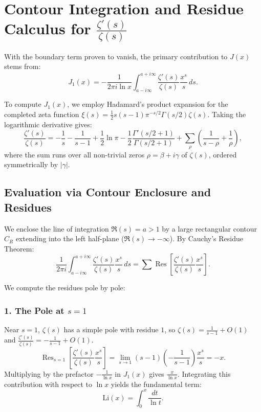 \documentclass[11pt,a4paper]{article}
\theoremstyle{definition}
\begin{document}
\section{Contour Integration and Residue Calculus for $\frac{\zeta'(s)}{\zeta(s)}$}

With the boundary term proven to vanish, the primary contribution to $J(x)$ stems from:
\begin{equation}
    J_1(x) = -\frac{1}{2\pi i \ln x} \int_{a - i\infty}^{a + i\infty} \frac{\zeta'(s)}{\zeta(s)} \frac{x^s}{s} \, ds.
\end{equation}

To compute $J_1(x)$, we employ Hadamard's product expansion for the completed zeta function $\xi(s) = \frac{1}{2} s(s-1)\pi^{-s/2}\Gamma(s/2)\zeta(s)$. Taking the logarithmic derivative gives:
\begin{equation}
    \frac{\zeta'(s)}{\zeta(s)} = -\frac{1}{s} - \frac{1}{s-1} + \frac{1}{2}\ln \pi - \frac{1}{2}\frac{\Gamma'(s/2+1)}{\Gamma(s/2+1)} + \sum_{\rho} \left( \frac{1}{s - \rho} + \frac{1}{\rho} \right),
\end{equation}
where the sum runs over all non-trivial zeros $\rho = \beta + i\gamma$ of $\zeta(s)$, ordered symmetrically by $|\gamma|$.

\subsection{Evaluation via Contour Enclosure and Residues}

We enclose the line of integration $\Re(s) = a > 1$ by a large rectangular contour $C_R$ extending into the left half-plane ($\Re(s) \to -\infty$). By Cauchy's Residue Theorem:
\begin{equation}
    \frac{1}{2\pi i} \int_{a - i\infty}^{a + i\infty} \frac{\zeta'(s)}{\zeta(s)} \frac{x^s}{s} \, ds = \sum \operatorname{Res} \left[ \frac{\zeta'(s)}{\zeta(s)} \frac{x^s}{s} \right].
\end{equation}

We compute the residues pole by pole:

\subsubsection{1. The Pole at $s = 1$}
Near $s = 1$, $\zeta(s)$ has a simple pole with residue $1$, so $\zeta(s) = \frac{1}{s-1} + O(1)$ and $\frac{\zeta'(s)}{\zeta(s)} = -\frac{1}{s-1} + O(1)$.
\[
\operatorname{Res}_{s=1} \left[ \frac{\zeta'(s)}{\zeta(s)} \frac{x^s}{s} \right] = \lim_{s \to 1} (s-1) \left(-\frac{1}{s-1}\right) \frac{x^s}{s} = -x.
\]
Multiplying by the prefactor $-\frac{1}{\ln x}$ in $J_1(x)$ gives $\frac{x}{\ln x}$. Integrating this contribution with respect to $\ln x$ yields the fundamental term:
\begin{equation}
    \mathrm{Li}(x) = \int_{0}^{x} \frac{dt}{\ln t}.
\end{equation}
\end{document}

